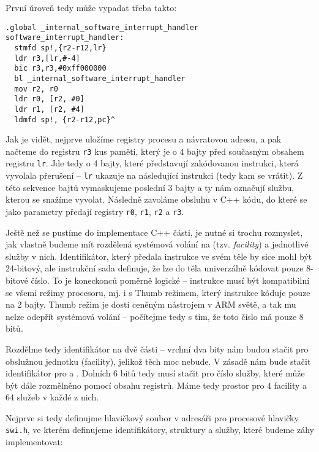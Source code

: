 \documentclass{article}
\begin{document}
První úroveň tedy může vypadat třeba takto:
\begin{lstlisting}
.global _internal_software_interrupt_handler
software_interrupt_handler:
  stmfd sp!,{r2-r12,lr}
  ldr r3,[lr,#-4]
  bic r3,r3,#0xff000000
  bl _internal_software_interrupt_handler
  mov r2, r0
  ldr r0, [r2, #0]
  ldr r1, [r2, #4]
  ldmfd sp!, {r2-r12,pc}^
\end{lstlisting}
Jak je vidět, nejprve uložíme registry procesu a návratovou adresu, a pak načteme do registru \texttt{r3} kus paměti, který je o 4 bajty před současným obsahem registru \texttt{lr}. Jde tedy o 4 bajty, které představují zakódovanou instrukci, která vyvolala přerušení -- \texttt{lr} ukazuje na následující instrukci (tedy kam se vrátit). Z této sekvence bajtů vymaskujeme poslední 3 bajty a ty nám označují službu, kterou se snažíme vyvolat. Následně zavoláme obsluhu v C++ kódu, do které se jako parametry  předají registry \texttt{r0}, \texttt{r1}, \texttt{r2} a \texttt{r3}.

Ještě než se pustíme do implementace C++ části, je nutné si trochu rozmyslet, jak vlastně budeme mít rozdělená systémová volání na  (tzv. \emph{facility}) a jednotlivé služby v nich. Identifikátor, který předala instrukce ve svém těle by sice mohl být 24-bitový, ale instrukční sada definuje, že lze do těla univerzálně kódovat pouze 8-bitové číslo. To je koneckonců poměrně logické -- instrukce musí být kompatibilní se všemi režimy procesoru, mj. i s Thumb režimem, který instrukce kóduje pouze na 2 bajty. Thumb režim je dosti ceněným nástrojem v ARM světě, a tak mu nelze odepřít systémová volání -- počítejme tedy s tím, že toto číslo má pouze 8 bitů.

Rozdělme tedy identifikátor na dvě části -- vrchní dva bity nám budou stačit pro obslužnou jednotku (facility), jelikož těch moc nebude. V zásadě nám bude stačit identifikátor pro  a . Dolních 6 bitů tedy musí stačit pro číslo služby, které může být dále rozmělněno pomocí obsahu registrů. Máme tedy prostor pro 4 facility a 64 služeb v každé z nich.

Nejprve si tedy definujme hlavičkový soubor v adresáři pro procesové hlavičky \texttt{swi.h}, ve kterém definujeme identifikátory, struktury a služby, které budeme záhy implementovat:
\end{document}
